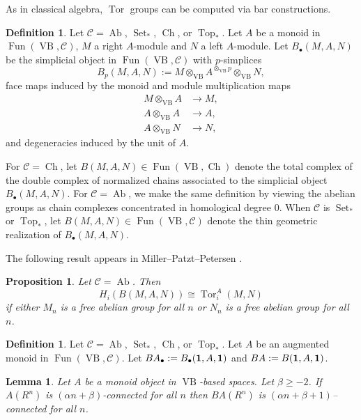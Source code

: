 \documentclass[a4paper]{amsart}
\DeclareMathOperator{\Tor}{Tor}
\DeclareMathOperator{\VB}{VB}
\DeclareMathOperator{\Ch}{Ch}
\DeclareMathOperator{\Ab}{Ab}
\DeclareMathOperator{\Top}{Top}
\DeclareMathOperator{\Set}{Set}
\DeclareMathOperator{\Fun}{Fun}
\newcommand{\m}{\to}
\newcommand{\cC}{\mathcal{C}}\newcommand{\cD}{\mathcal{D}}
\numberwithin{theoremcounter}{section}
\newtheorem{lemma}[lemmaauto]{Lemma}
\newtheorem{proposition}[propositionauto]{Proposition}
\theoremstyle{definition}
\newtheorem{definition}[Defauto]{Definition}
\theoremstyle{remark}
\begin{document}
As in classical algebra, $\Tor$ groups can be computed via bar constructions.

\begin{definition}
Let $\cC= \Ab$, ${\Set_*}$, $\Ch$, or ${\Top_*}$. Let $A$ be a monoid in $\Fun(\VB,\cC)$, $M$ a right $A$-module and $N$ a left $A$-module. Let $B_\bullet(M,A,N)$ be the simplicial object in $\Fun(\VB,\cC)$ with $p$-simplices $$B_p(M,A,N):=M \otimes_{\VB} A^{\otimes_{\VB}p} \otimes_{\VB} N,$$ face maps induced by the monoid and module multiplication maps \begin{align*} M \otimes_{\VB} A &\m M, \\  A \otimes_{\VB} A& \m A,\\ A \otimes_{\VB} N &\m N, \end{align*} and degeneracies induced by the unit of $A$. 

For $\cC=\Ch$, let $B(M,A,N) \in \Fun(\VB,\Ch)$ denote the total complex of the double complex of normalized chains associated to the simplicial object  $B_\bullet(M,A,N)$. For $\cC=\Ab$, we make the same definition by viewing the abelian groups as chain complexes concentrated in homological degree 0. When $\cC$ is ${\Set_*}$  or ${\Top_*}$, let $B(M,A,N) \in \Fun(\VB,\cC)$ denote the thin geometric realization of $B_\bullet(M,A,N)$.


\end{definition}


The following result appears in Miller--Patzt--Petersen \cite[Proposition 2.33]{MillerPatztPetersen}. 

\begin{proposition}  Let $\cC=\Ab$. Then $$H_i(B(M,A,N)) \cong \Tor_i^A(M,N)$$ if either $M_n$ is a free abelian group for all $n$ or $N_n$ is a free abelian group for all $n$. 
\end{proposition}

\begin{definition}

 Let $\cC=\Ab$, ${\Set_*}$,  $\Ch$, or ${\Top_*}$.  Let $A$ be an augmented monoid in $\Fun(\VB,\cC)$. Let $BA_{\bullet} :=B_{\bullet}({\bf 1},A,{\bf 1})$ and $BA :=B({\bf 1},A,{\bf 1})$.
\end{definition} 




\begin{lemma} \label{Bconn}
Let $A$ be a monoid object in  $\VB$-based spaces. Let $\beta \geq -2$. If $A(R^n)$  is $(\alpha n+\beta)$-connected for all $n$ then $BA(R^n)$ is $(\alpha n+\beta+1)$--connected for all $n$.
\end{lemma}
\end{document}
